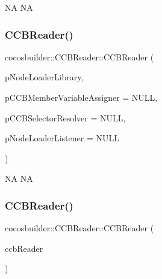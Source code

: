 NA  NA \mbox{\label{classcocosbuilder_1_1CCBReader_adb695d57810485e6ae5f392f76c6f274}} 
\subsubsection{\texorpdfstring{C\+C\+B\+Reader()}{CCBReader()}\hspace{0.1cm}{\footnotesize\ttfamily [4/6]}}
{\footnotesize\ttfamily cocosbuilder\+::\+C\+C\+B\+Reader\+::\+C\+C\+B\+Reader (\begin{DoxyParamCaption}\item[{\hyperlink{classcocosbuilder_1_1NodeLoaderLibrary}{Node\+Loader\+Library} $\ast$}]{p\+Node\+Loader\+Library,  }\item[{\hyperlink{classcocosbuilder_1_1CCBMemberVariableAssigner}{C\+C\+B\+Member\+Variable\+Assigner} $\ast$}]{p\+C\+C\+B\+Member\+Variable\+Assigner = {\ttfamily NULL},  }\item[{\hyperlink{classcocosbuilder_1_1CCBSelectorResolver}{C\+C\+B\+Selector\+Resolver} $\ast$}]{p\+C\+C\+B\+Selector\+Resolver = {\ttfamily NULL},  }\item[{\hyperlink{classcocosbuilder_1_1NodeLoaderListener}{Node\+Loader\+Listener} $\ast$}]{p\+Node\+Loader\+Listener = {\ttfamily NULL} }\end{DoxyParamCaption})}

NA  NA \mbox{\label{classcocosbuilder_1_1CCBReader_af51acafdd83099e8e66fd8793036200d}} 
\subsubsection{\texorpdfstring{C\+C\+B\+Reader()}{CCBReader()}\hspace{0.1cm}{\footnotesize\ttfamily [5/6]}}
{\footnotesize\ttfamily cocosbuilder\+::\+C\+C\+B\+Reader\+::\+C\+C\+B\+Reader (\begin{DoxyParamCaption}\item[{\hyperlink{classcocosbuilder_1_1CCBReader}{C\+C\+B\+Reader} $\ast$}]{ccb\+Reader }\end{DoxyParamCaption})}

